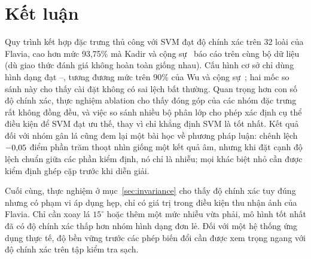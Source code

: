 \documentclass[11pt,a4paper]{article}
\begin{document}
\section{Kết luận}

Quy trình kết hợp đặc trưng thủ công với SVM đạt độ chính xác \bestacc{} trên 32 loài của Flavia, cao
hơn mức 93,75\% mà Kadir và cộng sự~\cite{kadir2011} báo cáo trên cùng bộ dữ liệu (dù giao thức đánh
giá không hoàn toàn giống nhau). Cấu hình cơ sở chỉ dùng hình dạng đạt \shapeonlyacc{}--\shapeonlyrf{},
tương đương mức trên 90\% của Wu và cộng sự~\cite{wu2007}; hai mốc so sánh này cho thấy cài đặt không
có sai lệch bất thường. Quan trọng hơn con số độ chính xác, thực nghiệm ablation cho thấy đóng góp của
các nhóm đặc trưng rất không đồng đều, và việc so sánh nhiều bộ phân lớp cho phép xác định cụ thể điều
kiện để SVM đạt ưu thế, thay vì chỉ khẳng định SVM là tốt nhất. Kết quả đối với nhóm gân lá cũng đem
lại một bài học về phương pháp luận: chênh lệch $-0{,}05$ điểm phần trăm thoạt nhìn giống một kết
quả âm, nhưng khi đặt cạnh độ lệch chuẩn giữa các phần kiểm định, nó chỉ là nhiễu; mọi khác biệt nhỏ
cần được kiểm định ghép cặp trước khi diễn giải.

Cuối cùng, thực nghiệm ở mục~\ref{sec:invariance} cho thấy độ chính xác \bestacc{} tuy đúng nhưng có
phạm vi áp dụng hẹp, chỉ có giá trị trong điều kiện thu nhận ảnh của Flavia. Chỉ cần xoay lá
$15^\circ$ hoặc thêm một mức nhiễu vừa phải, mô hình tốt nhất đã có độ chính xác thấp hơn nhóm hình
dạng đơn lẻ. Đối với một hệ thống ứng dụng thực tế, độ bền vững trước các phép biến đổi cần được xem
trọng ngang với độ chính xác trên tập kiểm tra sạch.
\end{document}
